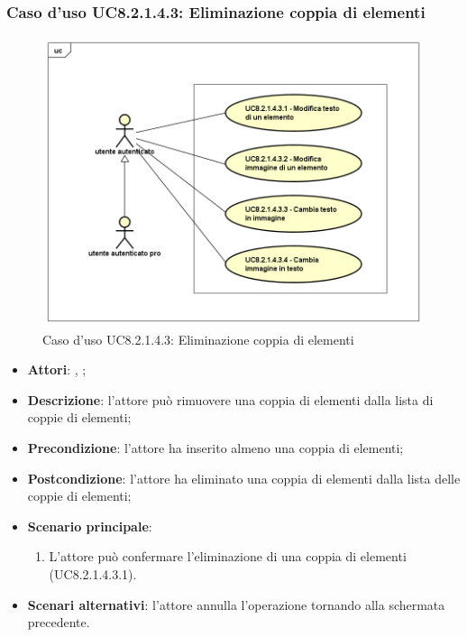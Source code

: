 	\subsubsection{Caso d'uso UC8.2.1.4.3: Eliminazione coppia di elementi}
	\label{UC8.2.1.4.3}
	\begin{figure}[h]
		\centering
		\includegraphics[scale=0.5,keepaspectratio]{UML/UC8_2_1_4_3.png}
		\caption{Caso d'uso UC8.2.1.4.3: Eliminazione coppia di elementi}
	\end{figure}
	\FloatBarrier
	\begin{itemize}
		\item \textbf{Attori}: \uau, \uaupro;
		\item \textbf{Descrizione}: l'attore può rimuovere una coppia di elementi dalla lista di coppie di elementi;
		\item \textbf{Precondizione}: l'attore ha inserito almeno una coppia di elementi;
		\item \textbf{Postcondizione}: l'attore ha eliminato una coppia di elementi dalla lista delle coppie di elementi;
		\item \textbf{Scenario principale}: 
		\begin{enumerate}
		\item L'attore può confermare l'eliminazione di una coppia di elementi (UC8.2.1.4.3.1).
		\end{enumerate}	
		\item \textbf{Scenari alternativi}: l'attore annulla l'operazione tornando alla schermata precedente.
	\end{itemize}

